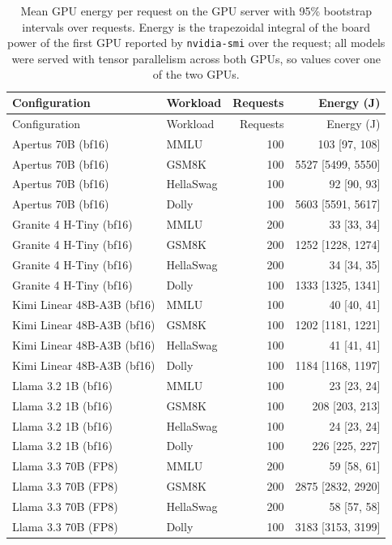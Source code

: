 \begin{longtable}{@{}l l r r@{}}
\caption{Mean GPU energy per request on the GPU server with 95\% bootstrap intervals over requests. Energy is the trapezoidal integral of the board power of the first GPU reported by \texttt{nvidia-smi} over the request; all models were served with tensor parallelism across both GPUs, so values cover one of the two GPUs.}\label{tab:s3}\\
\toprule
Configuration & Workload & Requests & Energy (J) \\
\midrule\endfirsthead
\toprule
Configuration & Workload & Requests & Energy (J) \\
\midrule\endhead
\bottomrule\endfoot
Apertus 70B (bf16) & MMLU & 100 & 103 [97, 108] \\
Apertus 70B (bf16) & GSM8K & 100 & 5527 [5499, 5550] \\
Apertus 70B (bf16) & HellaSwag & 100 & 92 [90, 93] \\
Apertus 70B (bf16) & Dolly & 100 & 5603 [5591, 5617] \\
Granite 4 H-Tiny (bf16) & MMLU & 200 & 33 [33, 34] \\
Granite 4 H-Tiny (bf16) & GSM8K & 200 & 1252 [1228, 1274] \\
Granite 4 H-Tiny (bf16) & HellaSwag & 200 & 34 [34, 35] \\
Granite 4 H-Tiny (bf16) & Dolly & 100 & 1333 [1325, 1341] \\
Kimi Linear 48B-A3B (bf16) & MMLU & 100 & 40 [40, 41] \\
Kimi Linear 48B-A3B (bf16) & GSM8K & 100 & 1202 [1181, 1221] \\
Kimi Linear 48B-A3B (bf16) & HellaSwag & 100 & 41 [41, 41] \\
Kimi Linear 48B-A3B (bf16) & Dolly & 100 & 1184 [1168, 1197] \\
Llama 3.2 1B (bf16) & MMLU & 100 & 23 [23, 24] \\
Llama 3.2 1B (bf16) & GSM8K & 100 & 208 [203, 213] \\
Llama 3.2 1B (bf16) & HellaSwag & 100 & 24 [23, 24] \\
Llama 3.2 1B (bf16) & Dolly & 100 & 226 [225, 227] \\
Llama 3.3 70B (FP8) & MMLU & 200 & 59 [58, 61] \\
Llama 3.3 70B (FP8) & GSM8K & 200 & 2875 [2832, 2920] \\
Llama 3.3 70B (FP8) & HellaSwag & 200 & 58 [57, 58] \\
Llama 3.3 70B (FP8) & Dolly & 100 & 3183 [3153, 3199] \\

\end{longtable}
